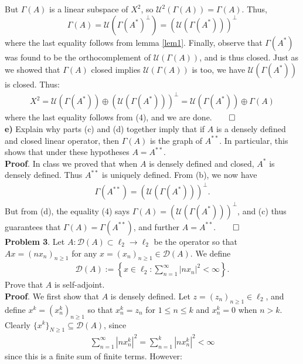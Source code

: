 \documentclass[10pt]{article}
\newcommand{\1}[1]{\mathbbm{1}_{#1}} \newcommand{\mc}[1]{\mathcal{#1}}
\begin{document}
    But $\Gamma(A)$ is a linear subspace of $X^2$, so $\mc{U}^2(\Gamma(A))=\Gamma(A)$. Thus,
    \[\Gamma(A)=\mc{U}(\Gamma(A^\ast)^\perp)=(\mc{U}(\Gamma(A^\ast)))^\perp\tag{4}\]
    where the last equality follows from lemma \ref{lem1}. Finally, observe that $\Gamma(A^\ast)$ was found to be the orthocomplement of $\mc{U}(\Gamma(A))$, and is thus closed. Just as we showed that $\Gamma(A)$ closed implies $\mc{U}(\Gamma(A))$ is too, we have
    $\mc{U}(\Gamma(A^\ast))$ is closed. Thus:
    \begin{align*}
        X^2=\mc{U}(\Gamma(A^\ast))\oplus(\mc{U}(\Gamma(A^\ast)))^\perp=\mc{U}(\Gamma(A^\ast))\oplus\Gamma(A)
    \end{align*}
    where the last equality follows from (4), and we are done.\hfill{$\qed$}\\[5pt]
    {\bf e)} Explain why parts (c) and (d) together imply that if $A$ is a densely defined and closed linear operator, then $\Gamma(A)$ is the graph of $A^{\ast\ast}$. In particular, this shows that under these hypotheses $A=A^{\ast\ast}$.\\[5pt]
    {\bf Proof}. In class we proved that when $A$ is densely defined and closed, $A^\ast$ is densely defined. Thus $A^{\ast\ast}$ is uniquely defined. From (b), we now have
    \begin{align*}
        \Gamma(A^{\ast\ast})=(\mc{U}(\Gamma(A^\ast)))^\perp.
    \end{align*}
    But from (d), the equality (4) says $\Gamma(A)=(\mc{U}(\Gamma(A^\ast)))^\perp$, and (c) thus guarantees that $\Gamma(A)=\Gamma(A^{\ast\ast})$, and further $A=A^{\ast\ast}$.\hfill{$\qed$}\\[5pt]
    {\bf Problem 3}. Let $A:\mc{D}(A)\subset \ell_2\rightarrow \ell_2$ be the operator so that $Ax=(nx_n)_{n\geq 1}$ for any $x=(x_n)_{n\geq 1}\in\mc{D}(A)$. We define
    \begin{align*}
        \mc{D}(A):=\left\{x\in\ell_2:\sum_{n=1}^\infty|nx_n|^2<\infty\right\}.
    \end{align*} 
    Prove that $A$ is self-adjoint.\\[5pt]
    {\bf Proof}. We first show that $A$ is densely defined. Let $z=(z_n)_{n\geq 1}\in\ell_2$, and define $x^k=(x^k_n)_{n\geq 1}$ so that $x_n^k=z_n$ for $1\leq n\leq k$ and $x^k_n=0$ when $n>k$. Clearly $\{x^k\}_{N\geq 1}\subseteq\mc{D}(A)$, since
    \begin{align*}
        \sum_{n=1}^\infty|nx^k_n|^2=\sum_{n=1}^k|nx^k_n|^2<\infty
    \end{align*}
    since this is a finite sum of finite terms. However:
\end{document}
